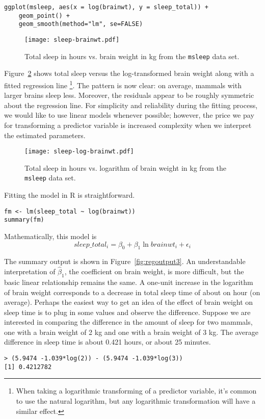 \begin{Verbatim}[samepage=true]
ggplot(msleep, aes(x = log(brainwt), y = sleep_total)) +
    geom_point() +
    geom_smooth(method="lm", se=FALSE)
\end{Verbatim}

\begin{figure}
\begin{center}
\texttt{[image: sleep-brainwt.pdf]}
\caption{Total sleep in hours vs. brain weight in kg from the \texttt{msleep}
data set.}
\label{fig:sleep-brainwt}
\end{center}
\end{figure}

Figure~\ref{fig:sleep-log-brainwt} shows total sleep versus the
log-transformed brain weight along with a fitted regression line
\footnote{When taking a logarithmic transforming of a predictor
  variable, it's common to use the natural logarithm, but any
  logarithmic transformation will have a similar effect.}. The pattern
is now clear: on average, mammals with larger brains sleep
less. Moreover, the residuals appear to be roughly symmetric about the
regression line. For simplicity and reliability during the fitting
process, we would like to use linear models whenever possible;
however, the price we pay for transforming a predictor variable is
increased complexity when we interpret the estimated parameters.

\begin{figure}
\begin{center}
\texttt{[image: sleep-log-brainwt.pdf]}
\caption{Total sleep in hours vs. logarithm of brain weight in kg from the \texttt{msleep}
data set.}
\label{fig:sleep-log-brainwt}
\end{center}
\end{figure}

Fitting the model in R is straightforward.
\begin{Verbatim}[samepage=true]
fm <- lm(sleep_total ~ log(brainwt))
summary(fm)
\end{Verbatim}
Mathematically, this model is
\begin{equation}
  \label{eq:sleep-log-brainwt}
  sleep\_total_i = \beta_0 + \beta_1 \ln brainwt_i + \epsilon_i
\end{equation}

The summary output is shown in Figure~\ref{fig:regoutput3}.  An
understandable interpretation of $\hat{\beta}_1$, the coefficient on
brain weight, is more difficult, but the basic linear relationship
remains the same. A one-unit increase in the logarithm of brain weight
corresponds to a decrease in total sleep time of about on hour (on
average). Perhaps the easiest way to get an idea of the effect of
brain weight on sleep time is to plug in some values and observe the
difference. Suppose we are interested in comparing the difference in the 
amount of sleep for two mammals, one with a brain weight of 2 kg
and one with a brain weight of 3 kg. The average difference in sleep
time is about 0.421 hours, or about 25 minutes.
\begin{Verbatim}[samepage=true]
> (5.9474 -1.039*log(2)) - (5.9474 -1.039*log(3))
[1] 0.4212782
\end{Verbatim}


